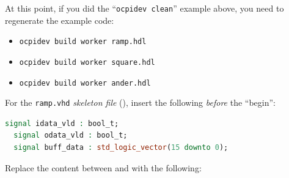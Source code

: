 \bstart
At this point, if you did the ``\texttt{ocpidev clean}'' example above, you need to regenerate the example code:
\begin{itemize}
\setlength\itemsep{0pt}
\item \texttt{ocpidev build worker ramp.hdl}
\item \texttt{ocpidev build worker square.hdl}
\item \texttt{ocpidev build worker ander.hdl}


\end{itemize}
\bend
\bstart
For the \verb+ramp.vhd+ \textit{skeleton file} (), insert the following \textit{before} the ``begin'':
\begin{lstlisting}[language=vhdl, columns=fullflexible, breaklines=true, prebreak=\textbackslash, basicstyle=\ttfamily, showstringspaces=false, upquote=true]
  signal idata_vld : bool_t;
  signal odata_vld : bool_t;
  signal buff_data : std_logic_vector(15 downto 0);
\end{lstlisting}
\bend
\pagebreak[1]
Replace the content between  and  with the following:

